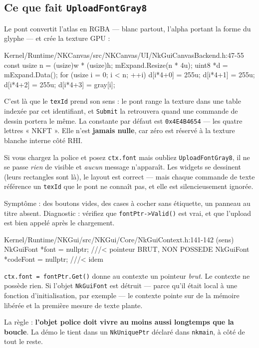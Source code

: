 \subsection{Ce que fait \texttt{UploadFontGray8}}

Le pont convertit l'atlas en RGBA — blanc partout, l'alpha portant la forme du
glyphe — et crée la texture GPU :

\begin{nkcode}{Kernel/Runtime/NKCanvas/src/NKCanvas/UI/NkGuiCanvasBackend.h:47-55}
const usize n = (usize)w * (usize)h;
mExpand.Resize(n * 4u);
uint8 *d = mExpand.Data();
for (usize i = 0; i < n; ++i) {
    d[i*4+0] = 255u; d[i*4+1] = 255u; d[i*4+2] = 255u; d[i*4+3] = gray[i];
}
\end{nkcode}

C'est là que le \texttt{texId} prend son sens : le pont range la texture dans une
table indexée par cet identifiant, et \texttt{Submit} la retrouvera quand une
commande de dessin portera le même. La constante par défaut est
\texttt{0x4E4B4654} — les quatre lettres « NKFT ». Elle n'est \textbf{jamais
nulle}, car zéro est réservé à la texture blanche interne côté RHI.

\begin{nkpiege}
Si vous chargez la police et posez \texttt{ctx.font} mais oubliez
\texttt{UploadFontGray8}, il ne se passe \emph{rien} de visible et
\emph{aucun} message n'apparaît. Les widgets se dessinent (leurs rectangles sont
là), le layout est correct — mais chaque commande de texte référence un
\texttt{texId} que le pont ne connaît pas, et elle est silencieusement ignorée.

Symptôme : des boutons vides, des cases à cocher sans étiquette, un panneau au
titre absent. Diagnostic : vérifiez que \texttt{fontPtr->Valid()} est vrai, et
que l'upload est bien appelé après le chargement.
\end{nkpiege}

\begin{nkpiege}
\begin{nkcode}{Kernel/Runtime/NKGui/src/NKGui/Core/NkGuiContext.h:141-142 (sens)}
NkGuiFont *font = nullptr;      ///< pointeur BRUT, NON POSSEDE
NkGuiFont *codeFont = nullptr;  ///< idem
\end{nkcode}

\texttt{ctx.font = fontPtr.Get()} donne au contexte un pointeur \emph{brut}. Le
contexte ne possède rien. Si l'objet \texttt{NkGuiFont} est détruit — parce qu'il
était local à une fonction d'initialisation, par exemple — le contexte pointe sur
de la mémoire libérée et la première mesure de texte plante.

La règle : \textbf{l'objet police doit vivre au moins aussi longtemps que la
boucle}. La démo le tient dans un \texttt{NkUniquePtr} déclaré dans
\texttt{nkmain}, à côté de tout le reste.
\end{nkpiege}

